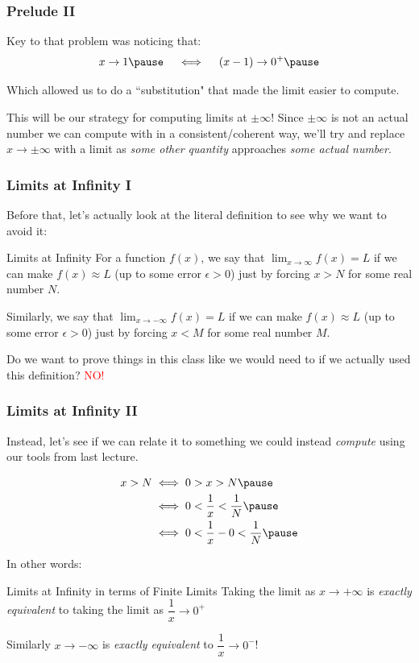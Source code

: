 \documentclass{ltx-talk}
\begin{document}
\begin{frame}
  \frametitle{Prelude II} 

  Key to that problem was noticing that: \pause
  \begin{equation}
    x \rightarrow 1 \pause \quad \iff \quad (x-1) \rightarrow 0^+ \pause
  \end{equation}

  Which allowed us to do a ``substitution" that made the limit easier to compute. \pause

  This will be our strategy for computing limits at $\pm \infty$! \pause
  Since $\pm \infty$ is not an actual number we can compute with in a consistent/coherent way, \pause
  we'll try and replace $x \rightarrow \pm \infty$ with a limit as \textit{some other quantity} approaches \textit{some actual number}.
\end{frame}

\begin{frame}
  \frametitle{Limits at Infinity I}

  Before that, let's actually look at the literal definition to see why we want to avoid it: \pause
  \begin{block}{Limits at Infinity}
    For a function $f(x)$, we say that $\lim_{x \rightarrow \infty} f(x) = L$ \pause
    if we can make $f(x) \approx L$ (up to some error $\epsilon > 0$) just by forcing $x > N$ for some real number $N$. \pause

    Similarly, we say that $\lim_{x \rightarrow -\infty} f(x) = L$ \pause
    if we can make $f(x) \approx L$ (up to some error $\epsilon > 0$) just by forcing $x < M$ for some real number $M$. \pause
  \end{block}

  Do we want to prove things in this class like we would need to if we actually used this definition? \pause
  \textcolor{red}{NO!}
\end{frame}

\begin{frame}
  \frametitle{Limits at Infinity II}
  Instead, let's see if we can relate it to something we could instead \textit{compute}
  using our tools from last lecture. \pause

  \begin{align}
    x > N &\iff 0 > x > N \pause \\
          &\iff 0 < \dfrac{1}{x} < \dfrac{1}{N} \pause \\
          &\iff 0 < \dfrac{1}{x} - 0 < \dfrac{1}{N} \pause
  \end{align}

  In other words: \pause
  \begin{alertblock}{Limits at Infinity in terms of Finite Limits}
    Taking the limit as $x \rightarrow + \infty$ is \textit{exactly equivalent} to taking the limit as $\dfrac{1}{x} \rightarrow 0^+$ \pause

    Similarly $x \rightarrow - \infty$ is \textit{exactly equivalent} to $\dfrac{1}{x} \rightarrow 0^{-}$!
  \end{alertblock}
\end{frame}
\end{document}
